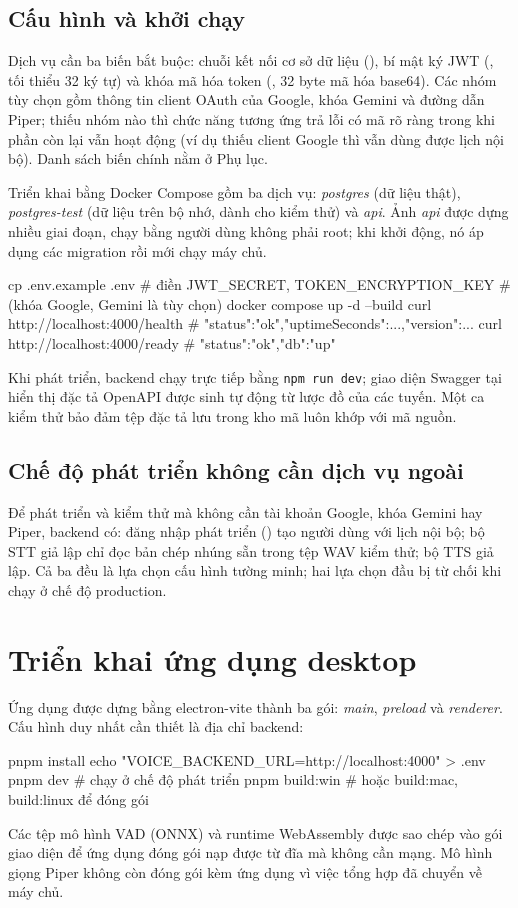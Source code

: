 \subsection{Cấu hình và khởi chạy}
Dịch vụ cần ba biến bắt buộc: chuỗi kết nối cơ sở dữ liệu (), bí mật ký JWT (, tối thiểu 32 ký tự) và khóa mã hóa token (, 32 byte mã hóa base64). Các nhóm tùy chọn gồm thông tin client OAuth của Google, khóa Gemini và đường dẫn Piper; thiếu nhóm nào thì chức năng tương ứng trả lỗi có mã rõ ràng trong khi phần còn lại vẫn hoạt động (ví dụ thiếu client Google thì vẫn dùng được lịch nội bộ). Danh sách biến chính nằm ở Phụ lục.

Triển khai bằng Docker Compose gồm ba dịch vụ: \textit{postgres} (dữ liệu thật), \textit{postgres-test} (dữ liệu trên bộ nhớ, dành cho kiểm thử) và \textit{api}. Ảnh \textit{api} được dựng nhiều giai đoạn, chạy bằng người dùng không phải root; khi khởi động, nó áp dụng các migration rồi mới chạy máy chủ.
\begin{code}
cp .env.example .env                # điền JWT_SECRET, TOKEN_ENCRYPTION_KEY
                                    # (khóa Google, Gemini là tùy chọn)
docker compose up -d --build
curl http://localhost:4000/health   # {"status":"ok","uptimeSeconds":...,"version":...}
curl http://localhost:4000/ready    # {"status":"ok","db":"up"}
\end{code}
Khi phát triển, backend chạy trực tiếp bằng \texttt{npm run dev}; giao diện Swagger tại  hiển thị đặc tả OpenAPI được sinh tự động từ lược đồ của các tuyến. Một ca kiểm thử bảo đảm tệp đặc tả lưu trong kho mã luôn khớp với mã nguồn.

\subsection{Chế độ phát triển không cần dịch vụ ngoài}
Để phát triển và kiểm thử mà không cần tài khoản Google, khóa Gemini hay Piper, backend có: đăng nhập phát triển () tạo người dùng với lịch nội bộ; bộ STT giả lập chỉ đọc bản chép nhúng sẵn trong tệp WAV kiểm thử; bộ TTS giả lập. Cả ba đều là lựa chọn cấu hình tường minh; hai lựa chọn đầu bị từ chối khi chạy ở chế độ production.

\section{Triển khai ứng dụng desktop}
Ứng dụng được dựng bằng electron-vite thành ba gói: \textit{main}, \textit{preload} và \textit{renderer}. Cấu hình duy nhất cần thiết là địa chỉ backend:
\begin{code}
pnpm install
echo "VOICE_BACKEND_URL=http://localhost:4000" > .env
pnpm dev                    # chạy ở chế độ phát triển
pnpm build:win              # hoặc build:mac, build:linux để đóng gói
\end{code}
Các tệp mô hình VAD (ONNX) và runtime WebAssembly được sao chép vào gói giao diện để ứng dụng đóng gói nạp được từ đĩa mà không cần mạng. Mô hình giọng Piper không còn đóng gói kèm ứng dụng vì việc tổng hợp đã chuyển về máy chủ.

